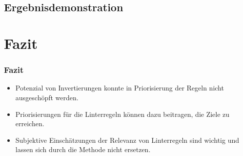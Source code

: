 \subsection{Ergebnisdemonstration}
\begin{frame}
\end{frame}

\section{Fazit}
\begin{frame}
  \frametitle{Fazit}
  \begin{itemize}
    \item Potenzial von Invertierungen konnte in Priorisierung der Regeln nicht ausgeschöpft werden.
    \item Priorisierungen für die Linterregeln können dazu beitragen, die Ziele zu erreichen.
    \item Subjektive Einschätzungen der Relevanz von Linterregeln sind wichtig und lassen sich durch die Methode nicht ersetzen.
  \end{itemize}
\end{frame}